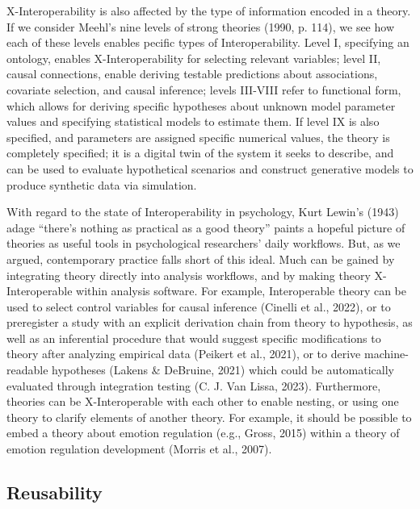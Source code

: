 \documentclass[man]{apa7}
\begin{document}
X-Interoperability is also affected by the type of information encoded in a theory.
If we consider Meehl's nine levels of strong theories (1990, p. 114),
we see how each of these levels enables pecific types of Interoperability.
Level I, specifying an ontology, enables X-Interoperability for selecting relevant variables;
level II, causal connections, enable deriving testable predictions about associations, covariate selection, and causal inference;
levels III-VIII refer to functional form,
which allows for deriving specific hypotheses about unknown model parameter values and specifying statistical models to estimate them.
If level IX is also specified, and parameters are assigned specific numerical values, the theory is completely specified; it is a digital twin of the system it seeks to describe, and can be used to evaluate hypothetical scenarios and construct generative models to produce synthetic data via simulation.

With regard to the state of Interoperability in psychology,
Kurt Lewin's (1943) adage ``there's nothing as practical as a good theory'' paints a hopeful picture of theories as useful tools in psychological researchers' daily workflows.
But, as we argued, contemporary practice falls short of this ideal.
Much can be gained by integrating theory directly into analysis workflows,
and by making theory X-Interoperable within analysis software.
For example, Interoperable theory can be used
to select control variables for causal inference (Cinelli et al., 2022),
or to preregister a study with an explicit derivation chain from theory to hypothesis,
as well as an inferential procedure that would suggest specific modifications to theory after analyzing empirical data (Peikert et al., 2021),
or to derive machine-readable hypotheses (Lakens \& DeBruine, 2021) which could be automatically evaluated through integration testing (C. J. Van Lissa, 2023).
Furthermore, theories can be X-Interoperable with each other to enable nesting, or using one theory to clarify elements of another theory.
For example, it should be possible to embed a theory about emotion regulation (e.g., Gross, 2015) within a theory of emotion regulation development (Morris et al., 2007).

\subsection{Reusability}\label{reusability}
\end{document}
